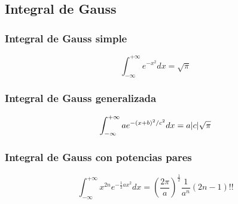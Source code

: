 \subsection{Integral de Gauss}\label{subsec:integral-de-gauss}
\subsubsection*{Integral de Gauss simple}
\begin{equation}
    \label{eq:integral-gauss}
    \int_{-\infty}^{+\infty} e^{-x^{2}}dx =\sqrt{\pi}
\end{equation}

\subsubsection*{Integral de Gauss generalizada}
\begin{equation}
    \label{eq:integral-gauss-generalizada}
    \int_{-\infty}^{+\infty} ae^{-(x+b)^{2}/c^2}dx =a\lvert c\rvert\sqrt{\pi}
\end{equation}

\subsubsection*{Integral de Gauss con potencias pares}
\begin{equation}
    \label{eq:integral-gauss-generalizada-potencias-pares}
    \int_{-\infty}^{+\infty} x^{2n}e^{-\frac{1}{2}ax^{2}}dx =\left(\frac{2\pi}{a}\right)^{\frac{1}{2}}\frac{1}{a^n}(2n-1)!!
\end{equation}
